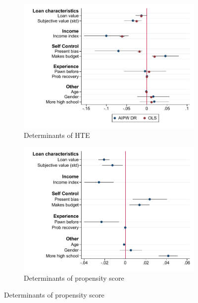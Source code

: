\documentclass[oneside,11pt]{article}
\begin{document}
\begin{figure}[H]
    \caption{Determinants of treatment effects and probability of choosing commitment}
    \label{determinants_ps_hte}
    \begin{center}
    \begin{subfigure}{0.475\textwidth}
        \caption{Determinants of HTE}
        \centering
        \includegraphics[width=\textwidth]{Figuras/HE/he_int_vertical_eff_cost_loan_pro_2.pdf}
    \end{subfigure}
    \begin{subfigure}{0.475\textwidth}
        \caption{Determinants of propensity score}
        \centering
        \includegraphics[width=\textwidth]{Figuras/HE/ps_int_vertical_pr_gbc_1.pdf}
    \end{subfigure}
  

\end{center}
\end{figure}
\end{document}
